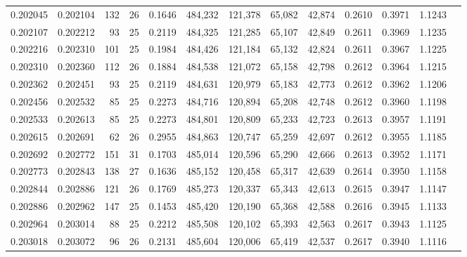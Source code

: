 \begin{tabular}{rrrrrrrrrrrrr}
0.202045 & 0.202104 & 132 &  26 &                                     0.1646 & 484,232 & 121,378 &  65,082 &  42,874 & 0.2610 & 0.3971 & 1.1243 \\
0.202107 & 0.202212 &  93 &  25 &                                     0.2119 & 484,325 & 121,285 &  65,107 &  42,849 & 0.2611 & 0.3969 & 1.1235 \\
0.202216 & 0.202310 & 101 &  25 &                                     0.1984 & 484,426 & 121,184 &  65,132 &  42,824 & 0.2611 & 0.3967 & 1.1225 \\
0.202310 & 0.202360 & 112 &  26 &                                     0.1884 & 484,538 & 121,072 &  65,158 &  42,798 & 0.2612 & 0.3964 & 1.1215 \\
0.202362 & 0.202451 &  93 &  25 &                                     0.2119 & 484,631 & 120,979 &  65,183 &  42,773 & 0.2612 & 0.3962 & 1.1206 \\
0.202456 & 0.202532 &  85 &  25 &                                     0.2273 & 484,716 & 120,894 &  65,208 &  42,748 & 0.2612 & 0.3960 & 1.1198 \\
0.202533 & 0.202613 &  85 &  25 &                                     0.2273 & 484,801 & 120,809 &  65,233 &  42,723 & 0.2613 & 0.3957 & 1.1191 \\
0.202615 & 0.202691 &  62 &  26 &                                     0.2955 & 484,863 & 120,747 &  65,259 &  42,697 & 0.2612 & 0.3955 & 1.1185 \\
0.202692 & 0.202772 & 151 &  31 &                                     0.1703 & 485,014 & 120,596 &  65,290 &  42,666 & 0.2613 & 0.3952 & 1.1171 \\
0.202773 & 0.202843 & 138 &  27 &                                     0.1636 & 485,152 & 120,458 &  65,317 &  42,639 & 0.2614 & 0.3950 & 1.1158 \\
0.202844 & 0.202886 & 121 &  26 &                                     0.1769 & 485,273 & 120,337 &  65,343 &  42,613 & 0.2615 & 0.3947 & 1.1147 \\
0.202886 & 0.202962 & 147 &  25 &                                     0.1453 & 485,420 & 120,190 &  65,368 &  42,588 & 0.2616 & 0.3945 & 1.1133 \\
0.202964 & 0.203014 &  88 &  25 &                                     0.2212 & 485,508 & 120,102 &  65,393 &  42,563 & 0.2617 & 0.3943 & 1.1125 \\
0.203018 & 0.203072 &  96 &  26 &                                     0.2131 & 485,604 & 120,006 &  65,419 &  42,537 & 0.2617 & 0.3940 & 1.1116 \\

\end{tabular}
